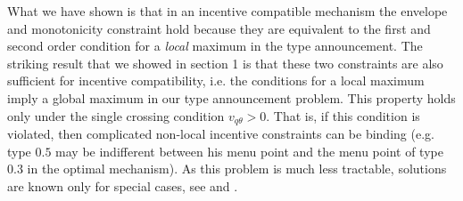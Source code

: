 \documentclass[12pt]{article}
\begin{document}
What we have shown is that in an incentive compatible mechanism the envelope and monotonicity constraint hold because they are equivalent to the first and second order condition for a \emph{local} maximum in the type announcement. The striking result that we showed in section 1 is that these two constraints are also sufficient for incentive compatibility, i.e. the conditions for a local maximum imply a global maximum in our type announcement problem. This property holds only under the single crossing condition $v_{q\theta }>0$. That is, if this condition is violated, then complicated non-local incentive constraints can be binding (e.g. type $0.5$ may be indifferent between his menu point and the menu point of type $0.3$ in the optimal mechanism). As this problem is much less tractable, solutions are known only for special cases, see \cite{araujo2010adverse} and \cite{schottmueller2015jet}.



\end{document}
